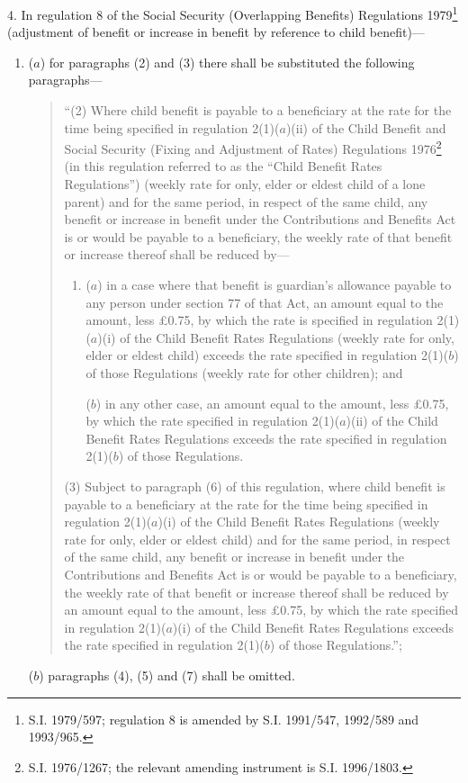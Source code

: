 \documentclass[a4paper]{article}
\begin{document}
4.  In regulation 8 of the Social Security (Overlapping Benefits) Regulations 1979\footnote{\frenchspacing S.I. 1979/597; regulation 8 is amended by S.I. 1991/547, 1992/589 and 1993/965.} (adjustment of benefit or increase in benefit by reference to child benefit)—
\begin{enumerate}\item[]
($a$) for paragraphs (2) and (3) there shall be substituted the following paragraphs—
\begin{quotation}
“(2) Where child benefit is payable to a beneficiary at the rate for the time being specified in regulation 2(1)($a$)(ii) of the Child Benefit and Social Security (Fixing and Adjustment of Rates) Regulations 1976\footnote{\frenchspacing S.I. 1976/1267; the relevant amending instrument is S.I. 1996/1803.} (in this regulation referred to as the “Child Benefit Rates Regulations”) (weekly rate for only, elder or eldest child of a lone parent) and for the same period, in respect of the same child, any benefit or increase in benefit under the Contributions and Benefits Act is or would be payable to a beneficiary, the weekly rate of that benefit or increase thereof shall be reduced by—
\begin{enumerate}\item[]
($a$) in a case where that benefit is guardian’s allowance payable to any person under section 77 of that Act, an amount equal to the amount, less £0.75, by which the rate is specified in regulation 2(1)($a$)(i) of the Child Benefit Rates Regulations (weekly rate for only, elder or eldest child) exceeds the rate specified in regulation 2(1)($b$) of those Regulations (weekly rate for other children); and

($b$) in any other case, an amount equal to the amount, less £0.75, by which the rate specified in regulation 2(1)($a$)(ii) of the Child Benefit Rates Regulations exceeds the rate specified in regulation 2(1)($b$) of those Regulations.
\end{enumerate}

(3) Subject to paragraph (6) of this regulation, where child benefit is payable to a beneficiary at the rate for the time being specified in regulation 2(1)($a$)(i) of the Child Benefit Rates Regulations (weekly rate for only, elder or eldest child) and for the same period, in respect of the same child, any benefit or increase in benefit under the Contributions and Benefits Act is or would be payable to a beneficiary, the weekly rate of that benefit or increase thereof shall be reduced by an amount equal to the amount, less £0.75, by which the rate specified in regulation 2(1)($a$)(i) of the Child Benefit Rates Regulations exceeds the rate specified in regulation 2(1)($b$) of those Regulations.”;
\end{quotation}

($b$) paragraphs (4), (5) and (7) shall be omitted.
\end{enumerate}
\end{document}
